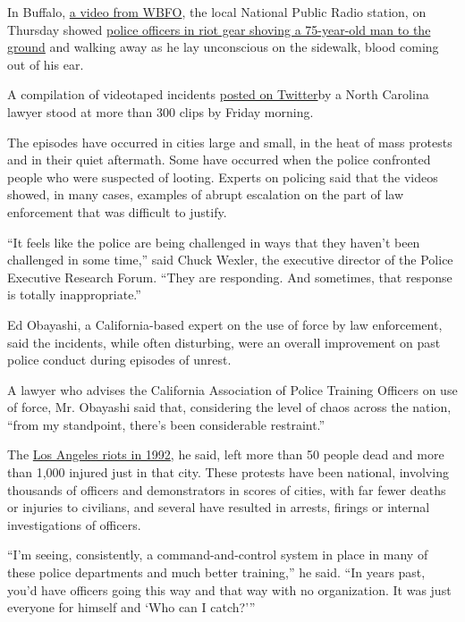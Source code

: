 In Buffalo,
\href{https://twitter.com/davidbegnaud/status/1268716877355810818?s=21}{a
video from WBFO}, the local National Public Radio station, on Thursday
showed
\href{https://www.nytimes.com/2020/06/05/us/buffalo-police-shove-protester-unrest.html}{police
officers in riot gear shoving a 75-year-old man to the ground} and
walking away as he lay unconscious on the sidewalk, blood coming out of
his ear.

A compilation of videotaped incidents
\href{https://twitter.com/greg_doucette}{posted on Twitter}by a North
Carolina lawyer stood at more than 300 clips by Friday morning.

The episodes have occurred in cities large and small, in the heat of
mass protests and in their quiet aftermath. Some have occurred when the
police confronted people who were suspected of looting. Experts on
policing said that the videos showed, in many cases, examples of abrupt
escalation on the part of law enforcement that was difficult to justify.

``It feels like the police are being challenged in ways that they
haven't been challenged in some time,'' said Chuck Wexler, the executive
director of the Police Executive Research Forum. ``They are responding.
And sometimes, that response is totally inappropriate.''

Ed Obayashi, a California-based expert on the use of force by law
enforcement, said the incidents, while often disturbing, were an overall
improvement on past police conduct during episodes of unrest.

A lawyer who advises the California Association of Police Training
Officers on use of force, Mr. Obayashi said that, considering the level
of chaos across the nation, ``from my standpoint, there's been
considerable restraint.''

The
\href{https://www.nytimes.com/2020/06/03/us/rodney-king-george-floyd-los-angeles.html}{Los
Angeles riots in 1992}, he said, left more than 50 people dead and more
than 1,000 injured just in that city. These protests have been national,
involving thousands of officers and demonstrators in scores of cities,
with far fewer deaths or injuries to civilians, and several have
resulted in arrests, firings or internal investigations of officers.

``I'm seeing, consistently, a command-and-control system in place in
many of these police departments and much better training,'' he said.
``In years past, you'd have officers going this way and that way with no
organization. It was just everyone for himself and `Who can I catch?'''

